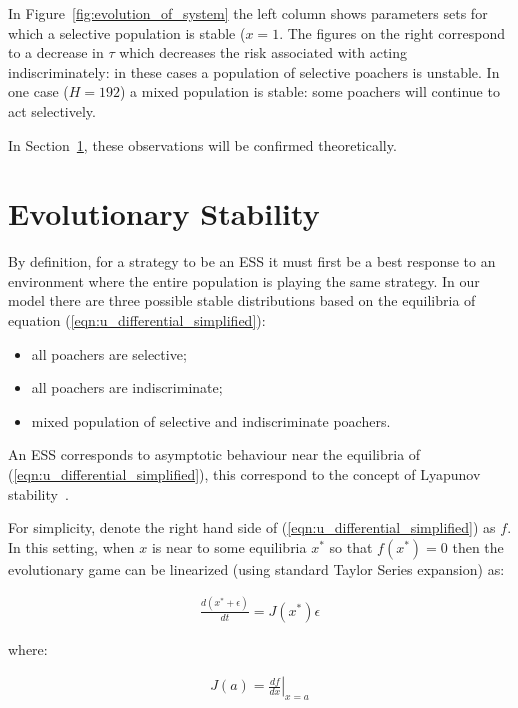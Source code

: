 \documentclass[10pt]{article}
\begin{document}
In Figure~\ref{fig:evolution_of_system} the left column shows parameters sets
for which a selective population is stable (\(x=1\). The figures on the right
correspond to a decrease in \(\tau\) which decreases the risk associated with
acting indiscriminately: in these cases a population of selective poachers is
unstable. In one case (\(H=192\)) a mixed population is stable: some poachers
will continue to act selectively.

In Section~\ref{section:evolutionary_stability}, these observations will be
confirmed theoretically.

\section{Evolutionary Stability}\label{section:evolutionary_stability}

By definition, for a strategy to be an ESS it must first be a best response to an
environment where the entire population is playing the same strategy.
In our model there are three possible stable distributions based on the
equilibria of equation (\ref{eqn:u_differential_simplified}):

\begin{itemize}
    \item all poachers are selective;
    \item all poachers are indiscriminate;
    \item mixed population of selective and indiscriminate poachers.
\end{itemize}

An ESS corresponds to asymptotic behaviour near the equilibria of
(\ref{eqn:u_differential_simplified}), this correspond to the concept of
Lyapunov stability~\cite{lyapunov1992general}.

For simplicity, denote the right hand side of
(\ref{eqn:u_differential_simplified}) as \(f\).
In this setting, when \(x\) is near to some equilibria \(x^*\) so that
\(f(x^*)=0\) then the evolutionary game can be linearized (using standard Taylor
Series expansion) as:

\begin{equation}
    \begin{split}
    \frac{d(x^* + \epsilon)}{dt} = J(x^*)\epsilon
    \end{split}
\end{equation}


where:

\begin{equation}
    \begin{split}
    J(a) = \left.\frac{df}{dx}\right|_{x=a}
    \end{split}
\end{equation}
\end{document}
